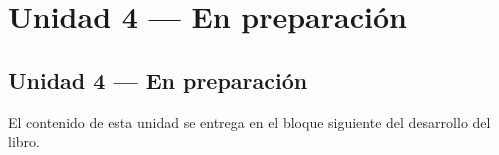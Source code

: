 %
\part{Unidad 4 --- En preparaci\'on}
\label{part:unidad4}

\chapter*{Unidad 4 --- En preparaci\'on}

El contenido de esta unidad se entrega en el bloque siguiente del desarrollo del libro.

\cleardoublepage

